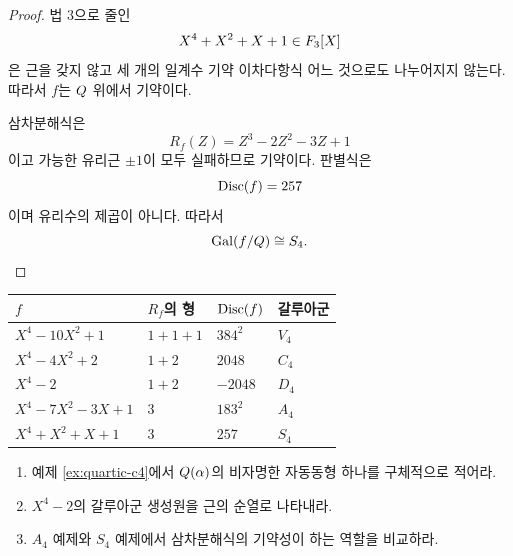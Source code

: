 \begin{proof}
법 $3$으로 줄인
\[
  X^4+X^2+X+1\in F_3[X]
\]
은 근을 갖지 않고 세 개의 일계수 기약 이차다항식 어느 것으로도 나누어지지 않는다. 따라서 $f$는 $Q$ 위에서 기약이다.

삼차분해식은
\[
  R_f(Z)=Z^3-2Z^2-3Z+1
\]
이고 가능한 유리근 $\pm1$이 모두 실패하므로 기약이다. 판별식은
\[
  \operatorname{Disc}(f)=257
\]
이며 유리수의 제곱이 아니다. 따라서
\[
  \operatorname{Gal}(f/Q)\cong S_4.
\]
\end{proof}

\begin{center}
\renewcommand{\arraystretch}{1.22}
\begin{tabular}{llll}
\toprule
$f$ & $R_f$의 형 & $\operatorname{Disc}(f)$ & 갈루아군 \\
\midrule
$X^4-10X^2+1$ & $1+1+1$ & $384^2$ & $V_4$ \\
$X^4-4X^2+2$ & $1+2$ & $2048$ & $C_4$ \\
$X^4-2$ & $1+2$ & $-2048$ & $D_4$ \\
$X^4-7X^2-3X+1$ & $3$ & $183^2$ & $A_4$ \\
$X^4+X^2+X+1$ & $3$ & $257$ & $S_4$ \\
\bottomrule
\end{tabular}
\end{center}

\begin{checkpoint}
\begin{enumerate}[label=(\alph*)]
  \item 예제 \ref{ex:quartic-c4}에서 $Q(\alpha)$의 비자명한 자동동형 하나를 구체적으로 적어라.
  \item $X^4-2$의 갈루아군 생성원을 근의 순열로 나타내라.
  \item $A_4$ 예제와 $S_4$ 예제에서 삼차분해식의 기약성이 하는 역할을 비교하라.
\end{enumerate}
\end{checkpoint}
